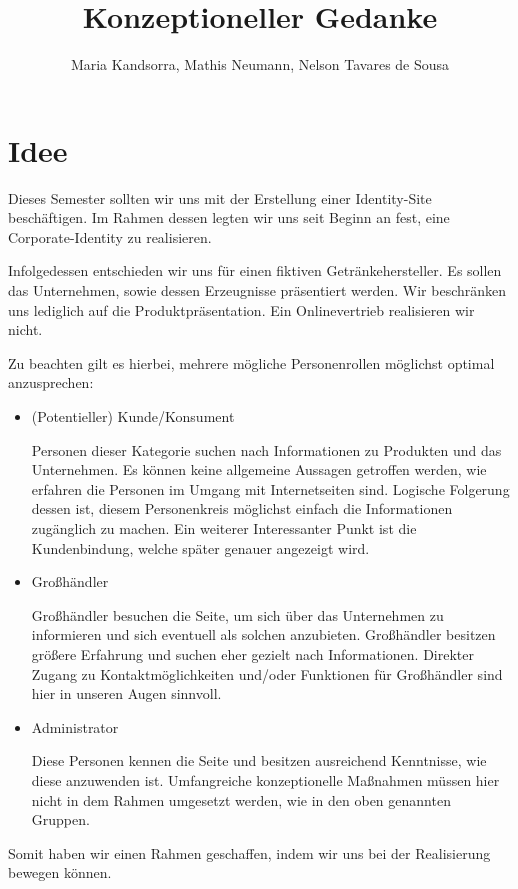 \documentclass[12pt,a4paper,oneside,ngerman]{article}
\begin{document}
\title{Konzeptioneller Gedanke} %
\author{Maria Kandsorra, Mathis Neumann, Nelson Tavares de Sousa}
\maketitle
\newpage

\tableofcontents

%
%
%
%

\newpage

\section{Idee}
Dieses Semester sollten wir uns mit der Erstellung einer Identity-Site beschäftigen.
Im Rahmen dessen legten wir uns seit Beginn an fest, eine Corporate-Identity zu realisieren.

Infolgedessen entschieden wir uns für einen fiktiven Getränkehersteller. Es sollen das Unternehmen, sowie dessen Erzeugnisse präsentiert werden. Wir beschränken uns lediglich auf die Produktpräsentation. Ein Onlinevertrieb realisieren wir nicht.

 Zu beachten gilt es hierbei, mehrere mögliche Personenrollen möglichst optimal anzusprechen:
\begin{itemize}
\item (Potentieller) Kunde/Konsument

Personen dieser Kategorie suchen nach Informationen zu Produkten und das Unternehmen. Es können keine allgemeine Aussagen getroffen werden, wie erfahren die Personen im Umgang mit Internetseiten sind. Logische Folgerung dessen ist, diesem Personenkreis möglichst einfach die Informationen zugänglich zu machen. Ein weiterer Interessanter Punkt ist die Kundenbindung, welche später genauer angezeigt wird.
\item Großhändler

Großhändler besuchen die Seite, um sich über das Unternehmen zu informieren und sich eventuell als solchen anzubieten. Großhändler besitzen größere Erfahrung und suchen eher gezielt nach Informationen. Direkter Zugang zu Kontaktmöglichkeiten und/oder Funktionen für Großhändler sind hier in unseren Augen sinnvoll.
\item Administrator

Diese Personen kennen die Seite und besitzen ausreichend Kenntnisse, wie diese anzuwenden ist.
Umfangreiche konzeptionelle Maßnahmen müssen hier nicht in dem Rahmen umgesetzt werden, wie in den oben genannten Gruppen.
\end{itemize}
Somit haben wir einen Rahmen geschaffen, indem wir uns bei der Realisierung bewegen können.
\end{document}

